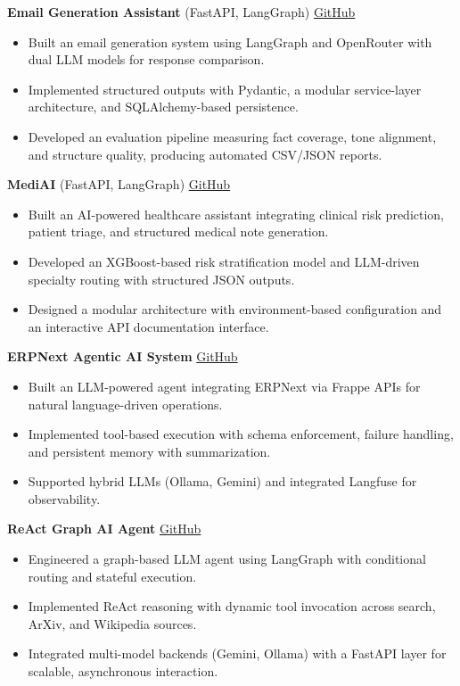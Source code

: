 \documentclass[11pt,a4paper]{article}
\begin{document}
\vspace{4pt}
\textbf{Email Generation Assistant} (FastAPI, LangGraph) \hfill \href{https://github.com/amhrahat/evaluatio-ai-email-generation}{GitHub}
\begin{itemize}
    \item Built an email generation system using LangGraph and OpenRouter with dual LLM models for response comparison.
    \item Implemented structured outputs with Pydantic, a modular service-layer architecture, and SQLAlchemy-based persistence.
    \item Developed an evaluation pipeline measuring fact coverage, tone alignment, and structure quality, producing automated CSV/JSON reports.
\end{itemize}

\vspace{4pt}
\textbf{MediAI} (FastAPI, LangGraph) \hfill \href{https://github.com/amhrahat/shukhee_demo}{GitHub}
\begin{itemize}
    \item Built an AI-powered healthcare assistant integrating clinical risk prediction, patient triage, and structured medical note generation.
    \item Developed an XGBoost-based risk stratification model and LLM-driven specialty routing with structured JSON outputs.
    \item Designed a modular architecture with environment-based configuration and an interactive API documentation interface.
\end{itemize}

\vspace{4pt}
\textbf{ERPNext Agentic AI System} \hfill \href{https://github.com/amhrahat/erp_agent}{GitHub}
\begin{itemize}
    \item Built an LLM-powered agent integrating ERPNext via Frappe APIs for natural language-driven operations.
    \item Implemented tool-based execution with schema enforcement, failure handling, and persistent memory with summarization.
    \item Supported hybrid LLMs (Ollama, Gemini) and integrated Langfuse for observability.
\end{itemize}

\vspace{4pt}
\textbf{ReAct Graph AI Agent} \hfill \href{https://github.com/amhrahat/ReAct-Graph-AI-Agent}{GitHub}
\begin{itemize}
    \item Engineered a graph-based LLM agent using LangGraph with conditional routing and stateful execution.
    \item Implemented ReAct reasoning with dynamic tool invocation across search, ArXiv, and Wikipedia sources.
    \item Integrated multi-model backends (Gemini, Ollama) with a FastAPI layer for scalable, asynchronous interaction.
\end{itemize}
\end{document}
